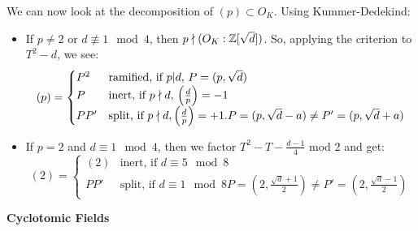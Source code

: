\documentclass[10pt,a4paper]{article}
\begin{document}
We can now look at the decomposition of $(p)\subset O_K$. Using Kummer-Dedekind:
\begin{itemize}
  \item If $p \neq 2$ or $d \nequiv 1 \mod 4$, then $p \nmid (O_K:\mathbb{Z}[\sqrt{d}])$. So, applying the criterion to $T^2-d$, we see:
  \[(p) = \begin{cases} P^2 & \text{ramified, if $p|d$, $P = (p,\sqrt{d})$}\\ P& \text{inert, if $p \nmid d$, $\left(\frac{d}{p}\right) = -1$}\\PP' & \text{split, if $p\nmid d, \left(\frac{d}{p}\right) = +1$}. P = (p, \sqrt{d}-a) \neq P' = (p, \sqrt{d}+a) \end{cases}\]
  \item If $p=2$ and $d \equiv 1 \mod 4$, then we factor $T^2-T-\frac{d-1}{4}$ mod 2 and get:
  \[(2) = \begin{cases} (2) & \text{inert, if $d\equiv 5 \mod 8$} \\ PP' & \text{split, if $d \equiv 1 \mod 8$} P=(2, \frac{\sqrt{d}+1}{2}) \neq P' = (2, \frac{\sqrt{d}-1}{2})\end{cases}\]
\end{itemize}

\textbf{Cyclotomic Fields}
\end{document}
